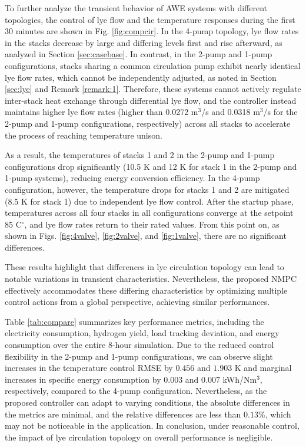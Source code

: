 \documentclass[review,3p,10pt]{elsarticle}
\begin{document}
To further analyze the transient behavior of AWE systems with different topologies, the control of lye flow and the temperature responses during the first 30 minutes are shown in Fig. \ref{fig:compcir}. %
In the 4-pump topology, lye flow rates in the stacks decrease by large and differing levels first and rise afterward, as analyzed in Section \ref{sec:casebase}. 
In contrast, in the 2-pump and 1-pump configurations, stacks sharing a common circulation pump exhibit nearly identical lye flow rates, which cannot be independently adjusted, as noted in Section \ref{sec:lye} and Remark \ref{remark:1}. Therefore, these systems cannot actively regulate inter-stack heat exchange through differential lye flow, and the controller instead maintains higher lye flow rates (higher than 0.0272 m$^3$/s and 0.0318 m$^3$/s for the 2-pump and 1-pump configurations, respectively) across all stacks to accelerate the process of reaching temperature unison.

As a result, the temperatures of stacks 1 and 2 in the 2-pump and 1-pump configurations drop significantly (10.5 K and 12 K for stack 1 in the 2-pump and 1-pump systems), reducing energy conversion efficiency. In the 4-pump configuration, however, the temperature drops for stacks 1 and 2 are mitigated (8.5 K for stack 1) due to independent lye flow control. %
After the startup phase, temperatures across all four stacks in all configurations converge at the setpoint $85$ C$^\circ$, and lye flow rates return to their rated values. From this point on, as shown in Figs. \ref{fig:4valve}, \ref{fig:2valve}, and \ref{fig:1valve}, there are no significant differences.

These results highlight that differences in lye circulation topology can lead to notable variations in transient characteristics. %
Nevertheless, the proposed NMPC effectively accommodates these differing characteristics by optimizing multiple control actions from a global perspective, achieving similar performances.

Table \ref{tab:compare} summarizes key performance metrics, including the electricity consumption, hydrogen yield, load tracking deviation, and energy consumption over the entire 8-hour simulation. Due to the reduced control flexibility in the 2-pump and 1-pump configurations, %
we can observe slight increases in the temperature control RMSE by $0.456$ and $1.903$ K and marginal increases in specific energy consumption by 0.003 and 0.007 kWh/Nm$^3$, respectively, compared to the 4-pump configuration. Nevertheless, as the proposed controller can adapt %
to varying conditions, the absolute differences in the metrics are minimal, and the relative differences are less than $0.13$\%, which may not be noticeable in the application.
In conclusion, under reasonable control, the impact of lye circulation topology on overall performance is negligible.
\end{document}
